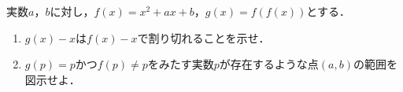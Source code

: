 \documentclass[../../main.tex]{subfiles}
\begin{document}
実数$a$，$b$に対し，$f(x)=x^2+ax+b$，$g(x)=f(f(x))$とする．
\begin{enumerate}
  \item $g(x)-x$は$f(x)-x$で割り切れることを示せ．
  \item $g(p)=p$かつ$f(p) \neq p$をみたす実数$p$が存在するような点$(a,b)$の範囲を図示せよ．
\end{enumerate}
\end{document}
